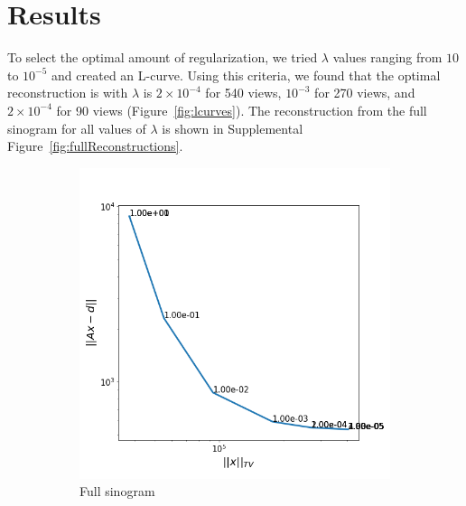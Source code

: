 \documentclass[12pt]{article}
\begin{document}
\section{Results}
To select the optimal amount of regularization, we tried $\lambda$ values ranging from $10$ to $10^{-5}$ and created an L-curve. Using this criteria, we found that the optimal reconstruction is with $\lambda$ is $2 \times 10^{-4}$ for 540 views, $10^{-3}$ for 270 views, and $2 \times 10^{-4}$ for 90 views (Figure~\ref{fig:lcurves}). The reconstruction from the full sinogram for all values of $\lambda$ is shown in Supplemental Figure~\ref{fig:fullReconstructions}.

\begin{figure}[h]
	\begin{subfigure}[t]{0.3\textwidth}
		\includegraphics[width=\linewidth]{../results/fistaFullLcurve.png}
		\caption{Full sinogram}
		\label{fig:lcurvefull}
	\end{subfigure}
	\hfill
	\begin{subfigure}[t]{0.3\textwidth}

\end{subfigure}
\end{figure}
\end{document}
